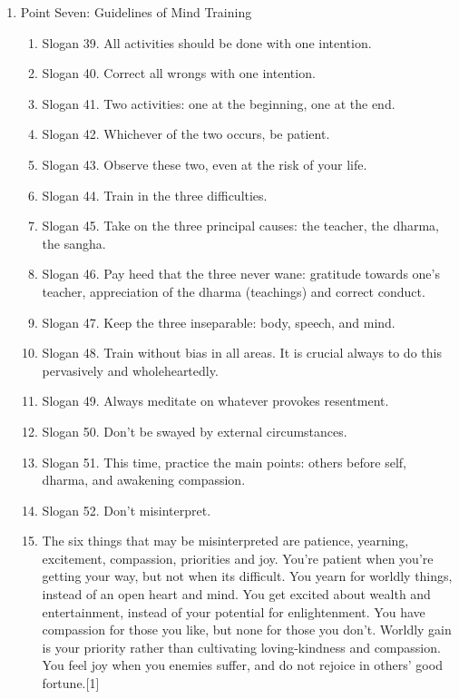 \begin{enumerate}
\begin{enumerate}
      \end{enumerate}
    \item Point Seven: Guidelines of Mind Training
      \begin{enumerate}
        \item Slogan 39. All activities should be done with one intention.
        \item Slogan 40. Correct all wrongs with one intention.
        \item Slogan 41. Two activities: one at the beginning, one at the end.
        \item Slogan 42. Whichever of the two occurs, be patient.
        \item Slogan 43. Observe these two, even at the risk of your life.
        \item Slogan 44. Train in the three difficulties.
        \item Slogan 45. Take on the three principal causes: the teacher, the dharma, the sangha.
        \item Slogan 46. Pay heed that the three never wane: gratitude towards one's teacher, appreciation of the dharma (teachings) and correct conduct.
        \item Slogan 47. Keep the three inseparable: body, speech, and mind.
        \item Slogan 48. Train without bias in all areas. It is crucial always to do this pervasively and wholeheartedly.
        \item Slogan 49. Always meditate on whatever provokes resentment.
        \item Slogan 50. Don't be swayed by external circumstances.
        \item Slogan 51. This time, practice the main points: others before self, dharma, and awakening compassion.
        \item Slogan 52. Don't misinterpret.

        \item     The six things that may be misinterpreted are patience, yearning, excitement, compassion, priorities and joy. You're patient when you're getting your way, but not when its difficult. You yearn for worldly things, instead of an open heart and mind. You get excited about wealth and entertainment, instead of your potential for enlightenment. You have compassion for those you like, but none for those you don't. Worldly gain is your priority rather than cultivating loving-kindness and compassion. You feel joy when you enemies suffer, and do not rejoice in others' good fortune.[1]


\end{enumerate}
\end{enumerate}
